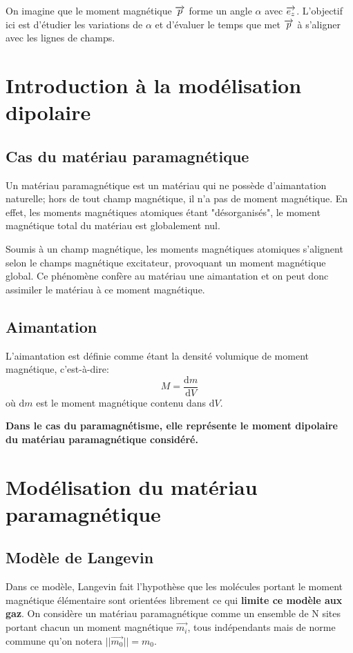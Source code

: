 \documentclass{report}
\begin{document}
On imagine que le moment magnétique $\overrightarrow{p}$ forme un angle $\alpha$ avec $\overrightarrow{e_z}$. L'objectif ici est d'étudier les variations de $\alpha$ et d'évaluer le temps que met $\overrightarrow{p}$ à s'aligner avec les lignes de champs.
\newpage

\section{Introduction à la modélisation dipolaire}
\subsection{Cas du matériau paramagnétique}
Un matériau paramagnétique est un matériau qui ne possède d'aimantation naturelle; hors de tout champ magnétique, il n'a pas de moment magnétique. En effet, les moments magnétiques atomiques étant "désorganisés", le moment magnétique total du matériau est globalement nul.

Soumis à un champ magnétique, les moments magnétiques atomiques s'alignent selon le champs magnétique excitateur, provoquant un moment magnétique global. Ce phénomène confère au matériau une aimantation et on peut donc assimiler le matériau à ce moment magnétique.

\subsection{Aimantation}
L'aimantation est définie comme étant la densité volumique de moment magnétique, c'est-à-dire: $$M = \frac{\mathrm{d}m}{\mathrm{d}V}$$
où $\mathrm{d}m$ est le moment magnétique contenu dans $\mathrm{d}V$.

\textbf{Dans le cas du paramagnétisme, elle représente le moment dipolaire du matériau paramagnétique considéré.}

\section{Modélisation du matériau paramagnétique}
\subsection{Modèle de Langevin}

Dans ce modèle, Langevin fait l'hypothèse que les molécules portant le moment magnétique élémentaire sont orientées librement ce qui \textbf{limite ce modèle aux gaz}.
On considère un matériau paramagnétique comme un ensemble de N sites portant chacun un moment magnétique $\vec{m_i}$, tous indépendants mais de norme commune qu'on notera $||\vec{m_0} || = m_0$.
\end{document}
